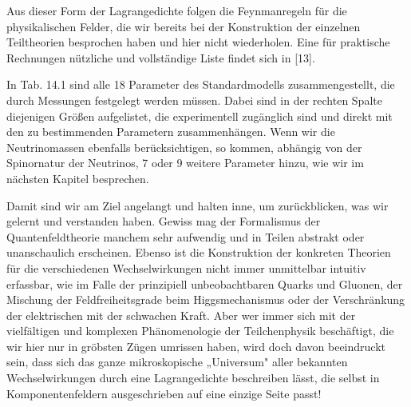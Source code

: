 \documentclass[10pt, letterpaper]{article}
\begin{document}
Aus dieser Form der Lagrangedichte folgen die Feynmanregeln für die physikalischen Felder, die wir bereits bei der Konstruktion der einzelnen Teiltheorien besprochen haben und hier nicht wiederholen. Eine für praktische Rechnungen nützliche und vollständige Liste findet sich in [13].

In Tab. 14.1 sind alle 18 Parameter des Standardmodells zusammengestellt, die durch Messungen festgelegt werden müssen. Dabei sind in der rechten Spalte diejenigen Größen aufgelistet, die experimentell zugänglich sind und direkt mit den zu bestimmenden Parametern zusammenhängen. Wenn wir die Neutrinomassen ebenfalls berücksichtigen, so kommen, abhängig von der Spinornatur der Neutrinos, 7 oder 9 weitere Parameter hinzu, wie wir im nächsten Kapitel besprechen.

Damit sind wir am Ziel angelangt und halten inne, um zurückblicken, was wir gelernt und verstanden haben. Gewiss mag der Formalismus der Quantenfeldtheorie manchem sehr aufwendig und in Teilen abstrakt oder unanschaulich erscheinen. Ebenso ist die Konstruktion der konkreten Theorien für die verschiedenen Wechselwirkungen nicht immer unmittelbar intuitiv erfassbar, wie im Falle der prinzipiell unbeobachtbaren Quarks und Gluonen, der Mischung der Feldfreiheitsgrade beim Higgsmechanismus oder der Verschränkung der elektrischen mit der schwachen Kraft. Aber wer immer sich mit der vielfältigen und komplexen Phänomenologie der Teilchenphysik beschäftigt, die wir hier nur in gröbsten Zügen umrissen haben, wird doch davon beeindruckt sein, dass sich das ganze mikroskopische „Universum" aller bekannten Wechselwirkungen durch eine Lagrangedichte beschreiben lässt, die selbst in Komponentenfeldern ausgeschrieben auf eine einzige Seite passt!
\end{document}
